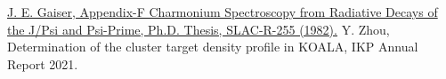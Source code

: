 \documentclass[fleqn,twocolumn,a4paper]{ikpar}
\begin{document}
\par
\medskip

\begin{thebibliography}{99}
  \href{https://www.slac.stanford.edu/cgi-bin/getdoc/slac-r-255.pdf}{J. E.
    Gaiser, Appendix-F Charmonium Spectroscopy from Radiative Decays of the J/Psi and Psi-Prime, Ph.D. Thesis, SLAC-R-255 (1982).}
 Y. Zhou, Determination of the cluster target density profile in KOALA, IKP Annual Report 2021.
\end{thebibliography}
\end{document}
